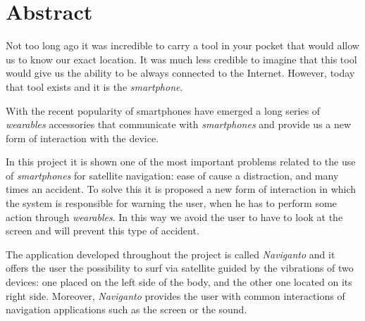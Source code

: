 \chapter{Abstract}

Not too long ago it was incredible to carry a tool in your pocket that would allow us to know our
exact location. It was much less credible to imagine that this tool would give us the ability to be
always connected to the Internet. However, today that tool exists and it is the
\emph{smartphone}.

With the recent popularity of smartphones have emerged a long series of \emph{wearables} accessories
that communicate with \emph{smartphones} and provide us a new form of interaction with the device.

In this project it is shown one of the most important problems related to the use of
\emph{smartphones} for satellite navigation: ease of cause a distraction, and many times an
accident. To solve this it is proposed a new form of interaction in which the system is responsible
for warning the user, when he has to perform some action through \emph{wearables}. In this way we
avoid the user to have to look at the screen and will prevent this type of accident.

The application developed throughout the project is called \emph{Naviganto} and it offers the user
the possibility to surf via satellite guided by the vibrations of two devices: one placed on the
left side of the body, and the other one located on its right side. Moreover, \emph{Naviganto}
provides the user with common interactions of navigation applications such as the screen or the
sound.

